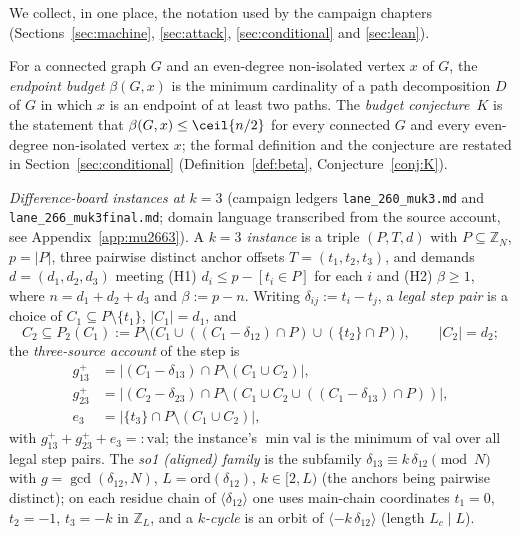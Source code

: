 We collect, in one place, the notation used by the campaign chapters
(Sections~\ref{sec:machine}, \ref{sec:attack}, \ref{sec:conditional} and \ref{sec:lean}).

\begin{definition}\label{def:endpointbudget}
For a connected graph $G$ and an even-degree non-isolated vertex $x$ of $G$, the \emph{endpoint
budget} $\beta(G,x)$ is the minimum cardinality of a path decomposition $D$ of $G$ in which $x$
is an endpoint of at least two paths. The \emph{budget conjecture~$K$} is the statement that
$\beta(G,x)\le\ceil{n/2}$ for every connected $G$ and every even-degree non-isolated vertex $x$;
the formal definition and the conjecture are restated in
Section~\ref{sec:conditional} (Definition~\ref{def:beta}, Conjecture~\ref{conj:K}).
\end{definition}

\begin{sloppypar}
\emph{Difference-board instances at $k=3$}
(campaign ledgers \texttt{lane\_260\_muk3.md} and \texttt{lane\_266\_muk3final.md}; domain
language transcribed from the source account, see Appendix~\ref{app:mu2663}). A
\emph{$k=3$ instance} is a triple $(P,T,d)$ with $P\subseteq\mathbb{Z}_N$, $p=|P|$,
three pairwise
distinct anchor offsets $T=(t_1,t_2,t_3)$, and demands $d=(d_1,d_2,d_3)$ meeting
(H1) $d_i\le p-[t_i\in P]$ for each $i$ and (H2) $\beta\ge 1$, where $n=d_1+d_2+d_3$ and
$\beta:=p-n$. Writing $\delta_{ij}:=t_i-t_j$, a \emph{legal step pair} is a choice of
$C_1\subseteq P\setminus\{t_1\}$, $|C_1|=d_1$, and
\[
  C_2\subseteq P_2(C_1):=P\setminus\bigl(C_1\cup((C_1-\delta_{12})\cap P)\cup
  (\{t_2\}\cap P)\bigr),\qquad |C_2|=d_2;
\]
the \emph{three-source account} of the step is
\[
\begin{aligned}
  g_{13}^{+}&=\bigl|(C_1-\delta_{13})\cap P\setminus(C_1\cup C_2)\bigr|,\\
  g_{23}^{+}&=\bigl|(C_2-\delta_{23})\cap P\setminus(C_1\cup C_2\cup
    ((C_1-\delta_{13})\cap P))\bigr|,\\
  e_3&=\bigl|\{t_3\}\cap P\setminus(C_1\cup C_2)\bigr|,
\end{aligned}
\]
with $g_{13}^{+}+g_{23}^{+}+e_3=:\mathrm{val}$; the instance's
$\min\mathrm{val}$ is the minimum of $\mathrm{val}$ over all legal step pairs.
The \emph{so1 (aligned) family} is the subfamily
$\delta_{13}\equiv k\,\delta_{12}\pmod N$ with $g=\gcd(\delta_{12},N)$,
$L=\mathrm{ord}(\delta_{12})$, $k\in[2,L)$ (the anchors being pairwise distinct); on each
residue chain of $\langle\delta_{12}\rangle$ one uses main-chain coordinates
$t_1=0$, $t_2=-1$, $t_3=-k$ in $\mathbb{Z}_L$, and a \emph{$k$-cycle} is an orbit of
$\langle-k\,\delta_{12}\rangle$ (length $L_c\mid L$).
\end{sloppypar}

